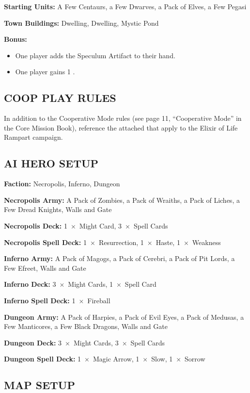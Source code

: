 \begin{multicols*}{2}
\textbf{Starting Units:} A Few Centaurs, a Few Dwarves, a Pack of Elves, a Few Pegasi

\textbf{Town Buildings:}  Dwelling,  Dwelling, Mystic Pond

\columnbreak
\textbf{Bonus:}
\begin{itemize}
  \item One player adds the Speculum Artifact to their hand.
  \item One player gains 1 .
\end{itemize}

\subsection*{\MakeUppercase{Coop Play Rules}}

In addition to the Cooperative Mode rules (see page 11, ``Cooperative Mode'' in the Core Mission Book), reference the attached  that apply to the Elixir of Life Rampart campaign.

\subsection*{\MakeUppercase{AI Hero Setup}}

\textbf{Faction:} Necropolis, Inferno, Dungeon

\textbf{Necropolis Army:} A Pack of Zombies, a Pack of Wraiths, a Pack of Liches, a Few Dread Knights, Walls and Gate

\textbf{Necropolis Deck:} 1~×~Might Card, 3~×~Spell Cards

\textbf{Necropolis Spell Deck:} 1~×~Resurrection, 1~×~Haste, 1~×~Weakness

\textbf{Inferno Army:} A Pack of Magogs, a Pack of Cerebri, a Pack of Pit Lords, a Few Efreet, Walls and Gate

\textbf{Inferno Deck:} 3~×~Might Cards, 1~×~Spell Card

\textbf{Inferno Spell Deck:} 1~×~Fireball

\textbf{Dungeon Army:} A Pack of Harpies, a Pack of Evil Eyes, a Pack of Medusas, a Few Manticores, a Few Black Dragons, Walls and Gate

\textbf{Dungeon Deck:} 3~×~Might Cards, 3~×~Spell Cards

\textbf{Dungeon Spell Deck:} 1~×~Magic Arrow, 1~×~Slow, 1~×~Sorrow

\subsection*{\MakeUppercase{Map Setup}}


\end{multicols*}
